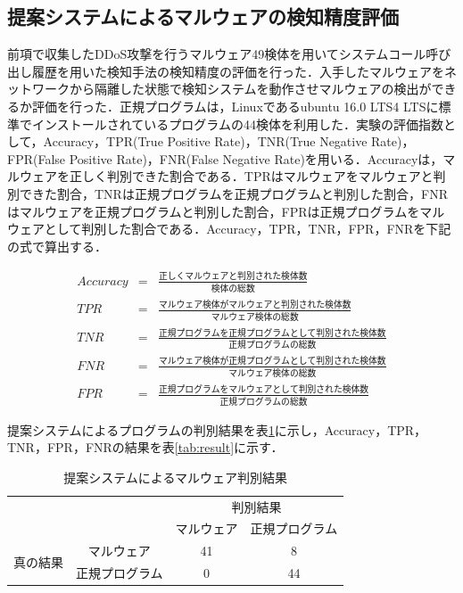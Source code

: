 \subsection{提案システムによるマルウェアの検知精度評価}
前項で収集したDDoS攻撃を行うマルウェア49検体を用いてシステムコール呼び出し履歴を用いた検知手法の検知精度の評価を行った．入手したマルウェアをネットワークから隔離した状態で検知システムを動作させマルウェアの検出ができるか評価を行った．正規プログラムは，Linuxであるubuntu  16.0 LTS4 LTSに標準でインストールされているプログラムの44検体を利用した．実験の評価指数として，Accuracy，TPR(True Positive Rate)，TNR(True Negative Rate)，FPR(False Positive Rate)，FNR(False Negative Rate)を用いる．Accuracyは，マルウェアを正しく判別できた割合である．TPRはマルウェアをマルウェアと判別できた割合，TNRは正規プログラムを正規プログラムと判別した割合，FNRはマルウェアを正規プログラムと判別した割合，FPRは正規プログラムをマルウェアとして判別した割合である．Accuracy，TPR，TNR，FPR，FNRを下記の式で算出する．

\begin{eqnarray}
    Accuracy & = & \frac{正しくマルウェアと判別された検体数}{検体の総数}\\
    TPR & = & \frac{マルウェア検体がマルウェアと判別された検体数}{マルウェア検体の総数}\\
    TNR & = & \frac{正規プログラムを正規プログラムとして判別された検体数}{正規プログラムの総数}\\
    FNR & = & \frac{マルウェア検体が正規プログラムとして判別された検体数}{マルウェア検体の総数}\\ 
    FPR & = & \frac{正規プログラムをマルウェアとして判別された検体数}{正規プログラムの総数}
\end{eqnarray}

提案システムによるプログラムの判別結果を表\ref{tab:detect}に示し，Accuracy，TPR，TNR，FPR，FNRの結果を表\ref{tab:result}に示す．

\begin{table}[h]
    \centering
    \caption{提案システムによるマルウェア判別結果}
    \label{tab:detect}
    \begin{tabular}{cc|c|c|}
    \cline{3-4}
    & \multicolumn{1}{l|}{} & \multicolumn{2}{c|}{判別結果} \\ \cline{3-4} 
    &                       & マルウェア      & 正規プログラム      \\ \hline
    \multicolumn{1}{|c|}{\multirow{2}{*}{真の結果}} & マルウェア                 & 41         & 8            \\ \cline{2-4} 
    \multicolumn{1}{|c|}{}                      & 正規プログラム               & 0          & 44           \\ \hline
    \end{tabular}
    \end{table}

